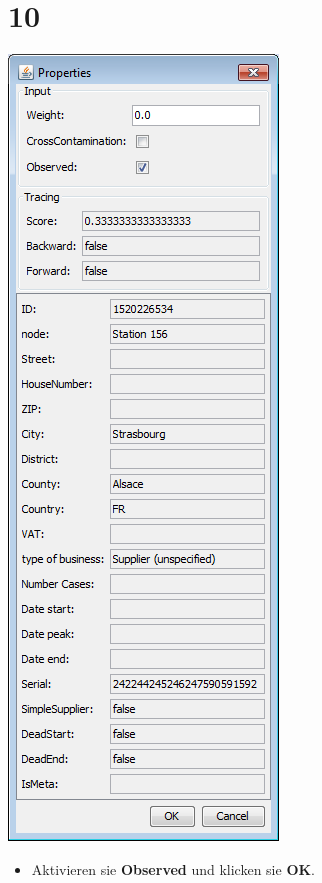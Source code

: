 \documentclass{beamer}
\begin{document}
\section{10}
\begin{frame}
	\begin{center}
  		\includegraphics[height=0.6\textheight]{10.png}
	\end{center}
	\begin{itemize}
		\item Aktivieren sie \textbf{Observed} und klicken sie \textbf{OK}.
	\end{itemize}
\end{frame}
\end{document}
